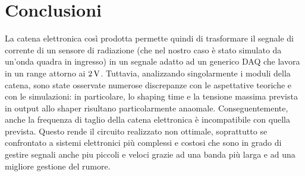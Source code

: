 \section{Conclusioni}
\label{sec:conclusioni}
La catena elettronica così prodotta permette quindi di trasformare il segnale
di corrente di un sensore di radiazione (che nel nostro caso è stato simulato da un'onda quadra in ingresso) in un segnale adatto ad un generico DAQ che lavora in un range attorno ai $2\,\si{\volt}$. Tuttavia, analizzando singolarmente i moduli della catena, sono state osservate numerose discrepanze con le aspettative teoriche e con le simulazioni: in particolare, lo shaping time e la tensione massima prevista in output allo shaper risultano particolarmente anaomale. Conseguentemente, anche la frequenza di taglio della catena elettronica è incompatibile con quella prevista.   Questo rende il circuito realizzato non ottimale, soprattutto se confrontato a sistemi elettronici più complessi e costosi che sono in grado di gestire segnali anche piu piccoli e veloci grazie ad una banda più larga e ad una migliore gestione del rumore.
